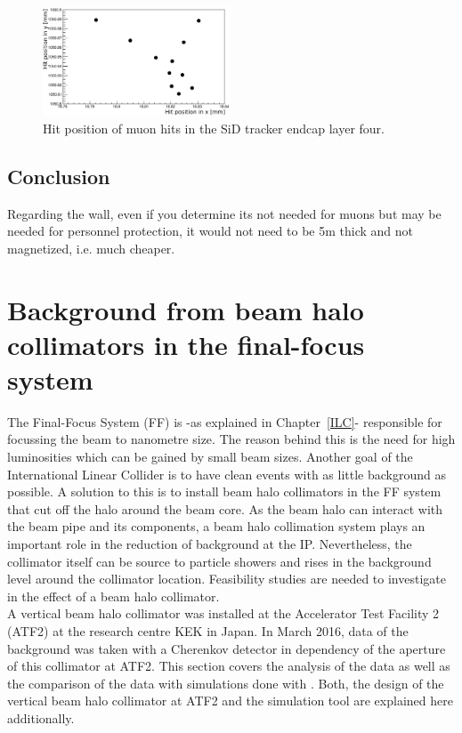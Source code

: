  \begin{figure}[htbp!]
\centering
\includegraphics[width=0.5\textwidth]{Figures/BDS_muons/LoopInACell.png}
\caption[BDS muons looping]{Hit position of muon hits in the SiD tracker endcap layer four.}
\label{fig:BDS_Muons:loop}
\end{figure}

\subsection{Conclusion}
Regarding the wall, even if you determine its not needed for muons but may be needed for personnel protection, it would not need to be 5m thick and not magnetized, i.e. much cheaper.

\section{Background from beam halo collimators in the final-focus system}

The Final-Focus System (FF) is -as explained in Chapter~\ref{ILC}- responsible for focussing the beam to nanometre size. The reason behind this is the need for high luminosities which can be gained by small beam sizes. Another goal of the International Linear Collider is to have clean events with as little background as possible. A solution to this is to install beam halo collimators in the FF system that cut off the halo around the beam core. As the beam halo can interact with the beam pipe and its components, a beam halo collimation system plays an important role in the reduction of background at the IP. Nevertheless, the collimator itself can be source to particle showers and rises in the background level around the collimator location. Feasibility studies are needed to investigate in the effect of a beam halo collimator.\\
A vertical beam halo collimator was installed at the Accelerator Test Facility 2 (ATF2) at the research centre KEK in Japan. In March 2016, data of the background was taken with a Cherenkov detector in dependency of the aperture of this collimator at ATF2. This section covers the analysis of the data as well as the comparison of the data with simulations done with \bdsim. Both, the design of the vertical beam halo collimator at ATF2 and the \geant simulation tool \bdsim are explained here additionally.


